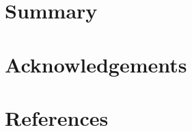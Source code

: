 {\footnotesize 




}
\section{Summary}

{\footnotesize 




}

\section*{Acknowledgements}

{\footnotesize 




}

\section*{References}

{\footnotesize 




}







